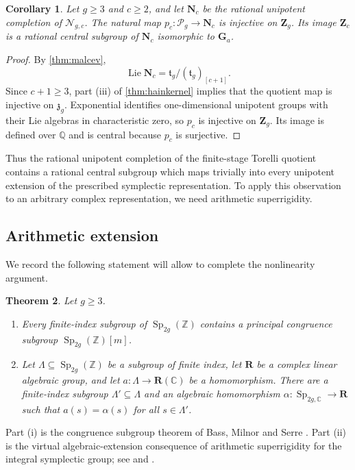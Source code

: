 \documentclass[11pt,a4paper]{article}
\newtheorem{theorem}{Theorem}[section]
\newtheorem{corollary}[theorem]{Corollary}
\theoremstyle{definition}
\newcommand{\Q}{\mathbb Q}
\newcommand{\Z}{\mathbb Z}
\newcommand{\C}{\mathbb C}
\newcommand{\Sp}{\operatorname{Sp}}
\newcommand{\Ga}{\mathbf G_a}
\newcommand{\Lie}{\operatorname{Lie}}
\begin{document}
\begin{corollary}\label{cor:centralline}
Let \(g\ge3\) and \(c\ge2\), and let \(\mathbf N_c\) be the
rational unipotent completion of \(\mathcal{N}_{g,c}\). The natural map
\(p_c:\mathscr{P}_g\to\mathbf N_c\) is injective on
\(\mathbf Z_g\). Its image \(\mathbf Z_c\) is a rational central
subgroup of \(\mathbf N_c\) isomorphic to \(\Ga\).
\end{corollary}
\begin{proof}
By \cref{thm:malcev},
\[
 \Lie\mathbf N_c=
 \mathfrak t_g/(\mathfrak t_g)_{[c+1]}.
\]
Since \(c+1\ge3\), part (iii) of \cref{thm:hainkernel} implies
that the quotient map is injective on \(\mathfrak z_g\).
Exponential identifies one-dimensional unipotent groups with their
Lie algebras in characteristic zero, so \(p_c\) is injective on
\(\mathbf Z_g\). Its image is defined over \(\Q\) and is central
because \(p_c\) is surjective.
\end{proof}

Thus the rational unipotent completion of the finite-stage Torelli quotient contains a rational central
subgroup which maps trivially into every unipotent extension of the
prescribed symplectic representation. To apply this observation to an
arbitrary complex representation, we need arithmetic superrigidity.

\subsection{Arithmetic extension}
We record the following statement will allow to complete the nonlinearity argument.
\begin{theorem}\label{thm:arithmeticextension}
Let \(g\ge3\).
\begin{enumerate}[label=(\roman*)]
\item Every finite-index subgroup of \(\Sp_{2g}(\Z)\) contains
      a principal congruence subgroup \(\Sp_{2g}(\Z)[m]\).
\item Let \(\Lambda\subseteq\Sp_{2g}(\Z)\) be a subgroup of finite index, let
      \(\mathbf R\) be a complex linear algebraic group, and let
      \(a:\Lambda\to\mathbf R(\C)\) be a homomorphism. There are
      a finite-index subgroup \(\Lambda'\subseteq\Lambda\) and an
      algebraic homomorphism
      \(\alpha:\Sp_{2g,\C}\to\mathbf R\) such that
      \(a(s)=\alpha(s)\) for all \(s\in\Lambda'\).
\end{enumerate}
\end{theorem}

Part (i) is the congruence subgroup theorem of Bass, Milnor and Serre
\cite[Theorem~14.1]{BassMilnorSerre}. Part (ii) is the virtual
algebraic-extension consequence of arithmetic superrigidity for the
integral symplectic group; see \cite[Chapter~VIII, Theorem~B]{Margulis}
and \cite[Section~6.1, Remarks after Conjecture~6.1, item~2]{ChurchFarb}.
\end{document}
